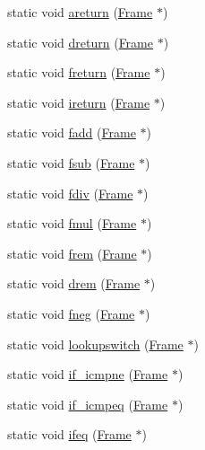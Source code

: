 \begin{DoxyCompactItemize}
\item 
static void \hyperlink{class_instruction_impl_a623cda309938e126ed0e636a89fc14e4}{areturn} (\hyperlink{struct_frame}{Frame} $\ast$)
\item 
static void \hyperlink{class_instruction_impl_a65263223a44a5a18c4db634cd813f8c1}{dreturn} (\hyperlink{struct_frame}{Frame} $\ast$)
\item 
static void \hyperlink{class_instruction_impl_a5a1994ab372769ea5d0d2928b127b71b}{freturn} (\hyperlink{struct_frame}{Frame} $\ast$)
\item 
static void \hyperlink{class_instruction_impl_a8a9efdee20b151e0e62335d6b8f549ac}{ireturn} (\hyperlink{struct_frame}{Frame} $\ast$)
\item 
static void \hyperlink{class_instruction_impl_a196f8bf373f9a81adcc82e1d771d8ae9}{fadd} (\hyperlink{struct_frame}{Frame} $\ast$)
\item 
static void \hyperlink{class_instruction_impl_a9a6a7861e714b445d4df50a1e64aa3dd}{fsub} (\hyperlink{struct_frame}{Frame} $\ast$)
\item 
static void \hyperlink{class_instruction_impl_af1afc7d4dd3cd1bd0590bde85bfa7776}{fdiv} (\hyperlink{struct_frame}{Frame} $\ast$)
\item 
static void \hyperlink{class_instruction_impl_acabd2e4de494642972fe05160d72bc91}{fmul} (\hyperlink{struct_frame}{Frame} $\ast$)
\item 
static void \hyperlink{class_instruction_impl_abbf458bb50f47da5e08bc16da4649fb6}{frem} (\hyperlink{struct_frame}{Frame} $\ast$)
\item 
static void \hyperlink{class_instruction_impl_ad174e56f91e13f820061af52027e0b48}{drem} (\hyperlink{struct_frame}{Frame} $\ast$)
\item 
static void \hyperlink{class_instruction_impl_adae4738ddd627884b30616e71e41c194}{fneg} (\hyperlink{struct_frame}{Frame} $\ast$)
\item 
static void \hyperlink{class_instruction_impl_aed343748fcb694a9d721ded471d8dc50}{lookupswitch} (\hyperlink{struct_frame}{Frame} $\ast$)
\item 
static void \hyperlink{class_instruction_impl_a8e42fd6f530eb52ce76639821e5c70e8}{if\+\_\+icmpne} (\hyperlink{struct_frame}{Frame} $\ast$)
\item 
static void \hyperlink{class_instruction_impl_aab5ede1fc831c4fe1f5357afcce60fb3}{if\+\_\+icmpeq} (\hyperlink{struct_frame}{Frame} $\ast$)
\item 
static void \hyperlink{class_instruction_impl_a7ec67e9356fb723910ae68b98a785a5a}{ifeq} (\hyperlink{struct_frame}{Frame} $\ast$)

\end{DoxyCompactItemize}
